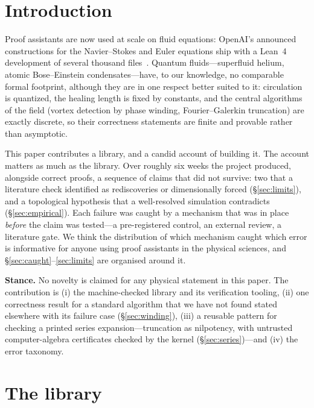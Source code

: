 \documentclass[11pt,a4paper]{article}
\theoremstyle{definition}
\begin{document}
\section{Introduction}

Proof assistants are now used at scale on fluid equations: OpenAI's announced constructions
for the Navier--Stokes and Euler equations ship with a Lean~4 development of several
thousand files~\cite{OpenAINSE}. Quantum fluids---superfluid helium, atomic Bose--Einstein
condensates---have, to our knowledge, no comparable formal footprint, although they are in
one respect better suited to it: circulation is quantized, the healing length is fixed by
constants, and the central algorithms of the field (vortex detection by phase winding,
Fourier--Galerkin truncation) are exactly discrete, so their correctness statements are
finite and provable rather than asymptotic.

This paper contributes a library, and a candid account of building it. The account matters
as much as the library. Over roughly six weeks the project produced, alongside correct
proofs, a sequence of claims that did not survive: two that a literature check identified as
rediscoveries or dimensionally forced (\S\ref{sec:limits}), and a topological hypothesis
that a well-resolved simulation contradicts (\S\ref{sec:empirical}). Each failure was caught
by a mechanism that was in place \emph{before} the claim was tested---a pre-registered
control, an external review, a literature gate. We think the distribution of which
mechanism caught which error is informative for anyone using proof assistants in the
physical sciences, and \S\ref{sec:caught}--\ref{sec:limits} are organised around it.

\begin{keybox}
\textbf{Stance.} No novelty is claimed for any physical statement in this paper. The
contribution is (i) the machine-checked library and its verification tooling, (ii) one
correctness result for a standard algorithm that we have not found stated elsewhere with its
failure case (\S\ref{sec:winding}), (iii) a reusable pattern for checking a printed series
expansion---truncation as nilpotency, with untrusted computer-algebra certificates checked by the
kernel (\S\ref{sec:series})---and (iv) the error taxonomy.
\end{keybox}

\section{The library}
\label{sec:library}
\end{document}
